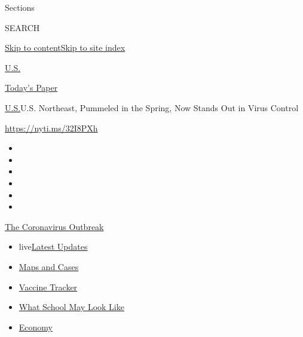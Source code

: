 Sections

SEARCH

\protect\hyperlink{site-content}{Skip to
content}\protect\hyperlink{site-index}{Skip to site index}

\href{https://www.nytimes.com/section/us}{U.S.}

\href{https://myaccount.nytimes.com/auth/login?response_type=cookie\&client_id=vi}{}

\href{https://www.nytimes.com/section/todayspaper}{Today's Paper}

\href{/section/us}{U.S.}\textbar{}U.S. Northeast, Pummeled in the
Spring, Now Stands Out in Virus Control

\url{https://nyti.ms/32I8PXh}

\begin{itemize}
\item
\item
\item
\item
\item
\item
\end{itemize}

\href{https://www.nytimes.com/news-event/coronavirus?action=click\&pgtype=Article\&state=default\&region=TOP_BANNER\&context=storylines_menu}{The
Coronavirus Outbreak}

\begin{itemize}
\tightlist
\item
  live\href{https://www.nytimes.com/2020/08/01/world/coronavirus-covid-19.html?action=click\&pgtype=Article\&state=default\&region=TOP_BANNER\&context=storylines_menu}{Latest
  Updates}
\item
  \href{https://www.nytimes.com/interactive/2020/us/coronavirus-us-cases.html?action=click\&pgtype=Article\&state=default\&region=TOP_BANNER\&context=storylines_menu}{Maps
  and Cases}
\item
  \href{https://www.nytimes.com/interactive/2020/science/coronavirus-vaccine-tracker.html?action=click\&pgtype=Article\&state=default\&region=TOP_BANNER\&context=storylines_menu}{Vaccine
  Tracker}
\item
  \href{https://www.nytimes.com/interactive/2020/07/29/us/schools-reopening-coronavirus.html?action=click\&pgtype=Article\&state=default\&region=TOP_BANNER\&context=storylines_menu}{What
  School May Look Like}
\item
  \href{https://www.nytimes.com/live/2020/07/31/business/stock-market-today-coronavirus?action=click\&pgtype=Article\&state=default\&region=TOP_BANNER\&context=storylines_menu}{Economy}
\end{itemize}

